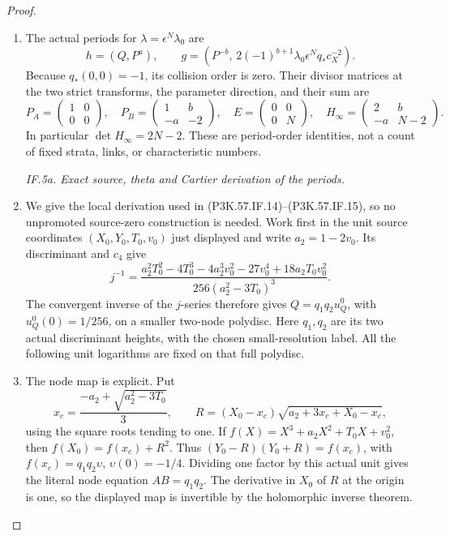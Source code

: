 \begin{proof}
\begin{enumerate}[label=\arabic*.]
\item The actual periods for \(\lambda=\epsilon^N\lambda_0\) are
\[
 h=(Q,P^a),\qquad
 g=(P^{-b},\,2(-1)^{b+1}\lambda_0\epsilon^N q_*c_X^{-2}).
                                                               \tag{P3K.57.IF.15}
\]
Because \(q_*(0,0)=-1\), its collision order is zero. Their divisor matrices
at the two strict transforms, the parameter direction, and their sum are
\[
 P_A=\begin{pmatrix}1&0\\0&0\end{pmatrix},\quad
 P_B=\begin{pmatrix}1&b\\-a&-2\end{pmatrix},\quad
 E=\begin{pmatrix}0&0\\0&N\end{pmatrix},\quad
 H_\infty=\begin{pmatrix}2&b\\-a&N-2\end{pmatrix}.
                                                               \tag{P3K.57.IF.16}
\]
In particular \(\det H_\infty=2N-2\). These are period-order identities,
not a count of fixed strata, links, or characteristic numbers.

\par\smallskip\noindent\textit{IF.5a. Exact source, theta and Cartier derivation of the periods.}\par\nopagebreak[4]

\item We give the local derivation used in (P3K.57.IF.14)--\allowbreak (P3K.57.IF.15), so no
unpromoted source-zero construction is needed. Work first in the
unit source coordinates \((X_0,Y_0,T_0,v_0)\) just displayed and
write \(a_2=1-2v_0\). Its discriminant and \(c_4\) give
\[
 j^{-1}=\frac{a_2^2T_0^2-4T_0^3-4a_2^3v_0^2-27v_0^4
                         +18a_2T_0v_0^2}
                   {256(a_2^2-3T_0)^3}.                 \tag{P3K.57.IF.16a}
\]
The convergent inverse of the \(j\)-series therefore gives
\(Q=q_1q_2u_Q^0\), with \(u_Q^0(0)=1/256\), on a
smaller two-node polydisc. Here \(q_1,q_2\) are its two
actual discriminant heights, with the chosen small-resolution
label. All the following unit logarithms are fixed on that
full polydisc.

\item The node map is explicit. Put
\[
 x_c=\frac{-a_2+\sqrt{a_2^2-3T_0}}3,\qquad
 R=(X_0-x_c)\sqrt{a_2+3x_c+X_0-x_c},
\]
using the square roots tending to one. If
\(f(X)=X^3+a_2X^2+T_0X+v_0^2\), then
\(f(X_0)=f(x_c)+R^2\). Thus
\((Y_0-R)(Y_0+R)=f(x_c)\), with
\(f(x_c)=q_1q_2\upsilon\), \(\upsilon(0)=-1/4\).
Dividing one factor by this actual unit gives the literal
node equation \(AB=q_1q_2\). The derivative in \(X_0\)
of \(R\) at the origin is one, so the displayed map is
invertible by the holomorphic inverse theorem.


\end{enumerate}
\end{proof}

